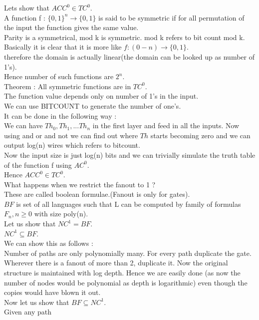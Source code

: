 \documentclass[solution,addpoints,12pt]{exam}
\begin{document}
Lets show that ${ACC}^0 \in {TC}^0$.\\
A function f : ${\{0, 1\}}^n \rightarrow \{0, 1\}$
is said to be symmetric if for all permutation
of the input the function gives the same value.\\
Parity is a symmetrical, mod k is symmetric. mod k refers
to bit count mod k.\\
Basically it is clear that it is more like $f : (0-n) \rightarrow \{0, 1\}$.\\
therefore the domain is actually linear(the domain can be looked up as
number of 1's).\\
Hence number of such functions are $2^n$.\\
Theorem : All symmetric functions are in ${TC}^0$.\\
The function value depends only on number of 1's in the input.\\
We can use BITCOUNT to generate the number of one's.\\
It can be done in the following way :\\
We can have $Th_0, Th_1, ... Th_n$  in the first layer and feed in
all the inputs. Now using and or and not we can find out where
$Th$ starts becoming zero and we can output log(n) wires which refers
to bitcount.\\
Now the input size is just log(n) bits and we can trivially simulate
the truth table of the function f using ${AC}^0$.\\

Hence ${ACC}^0 \in {TC}^0$.\\

What happens when we restrict the fanout to 1 ?\\
These are called boolean formulae.(Fanout is only for gates).\\
$BF$ is set of all languages such that L can be computed
by family of formulas $F_n, n \ge 0$ with size poly(n).\\
Let us show that ${NC}^1 = BF$.\\
${NC}^1 \subseteq BF$.\\
We can show this as follows :\\
Number of paths are only polynomially many. For
every path duplicate the gate. Wherever
there is a fanout of more than 2, duplicate it. Now
the original structure is maintained with log depth.
Hence we are easily done (as now the number of nodes would
be polynomial as depth is logarithmic) even though the copies
would have blown it out.\\

Now let us show that $BF \subseteq {NC}^1$.\\
Given any path
\end{document}
